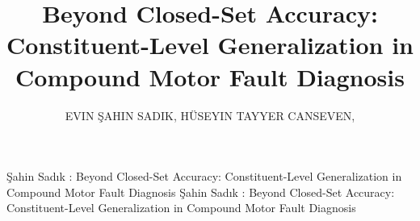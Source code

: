 \documentclass{ieeeaccess}
\begin{document}

\title{Beyond Closed-Set Accuracy: Constituent-Level Generalization in Compound Motor Fault Diagnosis}


\author{%
  \uppercase{Evin \c{S}ahin Sadik},
  \uppercase{H{\"u}seyin Tayyer Canseven}, %
}

\address[1]{Department of Electrical and Electronics Engineering, K\"utahya Dumlup{\i}nar University, 43100, K\"utahya, Turkey (e-mail: evin.sahin@dpu.edu.tr)}
\address[2]{Department of Electrical Engineering, Lappeenranta-Lahti University of Technology (LUT University), 53850, Lappeenranta, Finland}


\markboth
{\c{S}ahin Sad{\i}k \headeretal: Beyond Closed-Set Accuracy: Constituent-Level Generalization in Compound Motor Fault Diagnosis}
{\c{S}ahin Sad{\i}k \headeretal: Beyond Closed-Set Accuracy: Constituent-Level Generalization in Compound Motor Fault Diagnosis}

\end{document}

